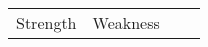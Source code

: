 \begin{table}
\centering
\begin{tabular}{llll}
\textcolor[rgb]{0.149,0.196,0.22}{Strength}                                                                                                                                                                                                                                                                                                                                                                                                                                                                                                                                                                                                                                                                                                                                                                                                                                                                                                                                                                                                                                                                                                                 & \textcolor[rgb]{0.149,0.196,0.22}{Weakness}                                                                                                                                                                                                                                                                                                                                                                                                                                                                                                                                                                                                                                                                                                                                                                                                                                                                                                                                                                                                                                                                                                                                                                                                                                                                                                                               &  &   \\

\end{tabular}
\end{table}
